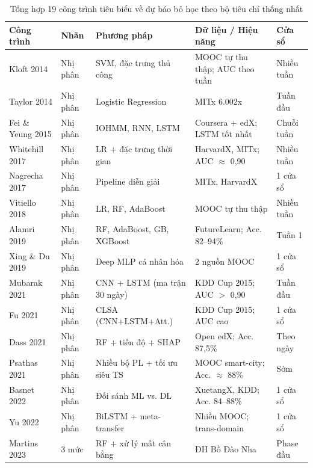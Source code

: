 \begin{table}[H]
\centering
\caption{Tổng hợp 19 công trình tiêu biểu về dự báo bỏ học theo bộ tiêu chí thống nhất}
\label{tab:khaosat}
\renewcommand{\arraystretch}{1.25}
\footnotesize
\begin{tabularx}{\textwidth}{@{}p{2.4cm} p{1.6cm} p{2.6cm} X p{1.7cm}@{}}
\toprule
\textbf{Công trình} & \textbf{Nhãn} & \textbf{Phương pháp} & \textbf{Dữ liệu / Hiệu năng} & \textbf{Cửa sổ} \\
\midrule
Kloft 2014 \cite{Kloft2014} & Nhị phân & SVM, đặc trưng thủ công & MOOC tự thu thập; AUC theo tuần & Nhiều tuần \\
Taylor 2014 \cite{Taylor2014} & Nhị phân & Logistic Regression & MITx 6.002x & Tuần đầu \\
Fei \& Yeung 2015 \cite{Fei2015} & Nhị phân & IOHMM, RNN, LSTM & Coursera + edX; LSTM tốt nhất & Chuỗi tuần \\
Whitehill 2017 \cite{Whitehill2017} & Nhị phân & LR + đặc trưng thời gian & HarvardX, MITx; AUC $\approx$ 0,90 & Nhiều tuần \\
Nagrecha 2017 \cite{Nagrecha2017} & Nhị phân & Pipeline diễn giải & MITx, HarvardX & 1 cửa sổ \\
Vitiello 2018 \cite{Vitiello2018} & Nhị phân & LR, RF, AdaBoost & MOOC tự thu thập & Nhiều tuần \\
Alamri 2019 \cite{Alamri2019} & Nhị phân & RF, AdaBoost, GB, XGBoost & FutureLearn; Acc. 82--94\% & Tuần 1 \\
Xing \& Du 2019 \cite{Xing2019} & Nhị phân & Deep MLP cá nhân hóa & 2 nguồn MOOC & 1 cửa sổ \\
Mubarak 2021 \cite{Mubarak2021} & Nhị phân & CNN + LSTM (ma trận 30 ngày) & KDD Cup 2015; AUC $>$ 0,90 & Tuần đầu \\
Fu 2021 \cite{Fu2021} & Nhị phân & CLSA (CNN+LSTM+Att.) & KDD Cup 2015; AUC cao & 1 cửa sổ \\
Dass 2021 \cite{Dass2021} & Nhị phân & RF + tiến độ + SHAP & Open edX; Acc. 87,5\% & Theo ngày \\
Psathas 2021 \cite{Psathas2021} & Nhị phân & Nhiều bộ PL + tối ưu siêu TS & MOOC smart-city; Acc. $\approx$ 88\% & Sớm \\
Basnet 2022 \cite{Basnet2022} & Nhị phân & Đối sánh ML vs. DL & XuetangX, KDD; Acc. 84--88\% & 1 cửa sổ \\
Yu 2022 \cite{Yu2022} & Nhị phân & BiLSTM + meta-transfer & Nhiều MOOC; trans-domain & 1 cửa sổ \\
Martins 2023 \cite{Martins2023} & 3 mức & RF + xử lý mất cân bằng & ĐH Bồ Đào Nha & Phase đầu \\

\end{tabularx}
\end{table}
